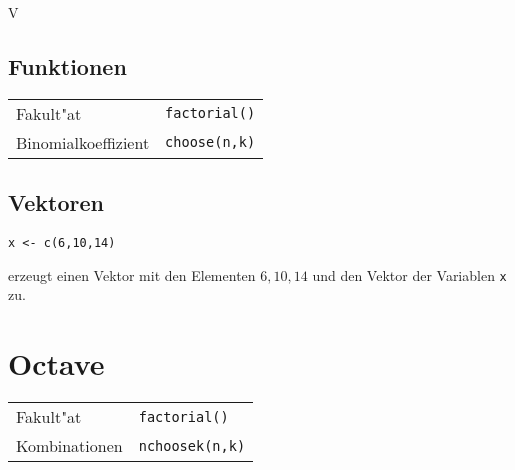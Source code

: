 \documentclass[ngerman, a4paper, 10pt, twocolumn, DIV20, headings=small]{scrartcl}
\begin{document}
V

\subsection{Funktionen}
\label{sec:r-funktionen}

\begin{tabular}{l l}
  Fakult"at & \verb|factorial()| \\
  Binomialkoeffizient & \verb|choose(n,k)| \\
\end{tabular}

\subsection{Vektoren}
\label{sec:r-vektoren}

\begin{verbatim}
x <- c(6,10,14)
\end{verbatim}
erzeugt einen Vektor mit den Elementen $6, 10, 14$ und den Vektor der Variablen \verb|x| zu.

\section{Octave}
\label{sec:octave}

\begin{tabular}{l l}
  Fakult"at & \verb|factorial()| \\
  Kombinationen & \verb|nchoosek(n,k)| \\
\end{tabular}
\end{document}
